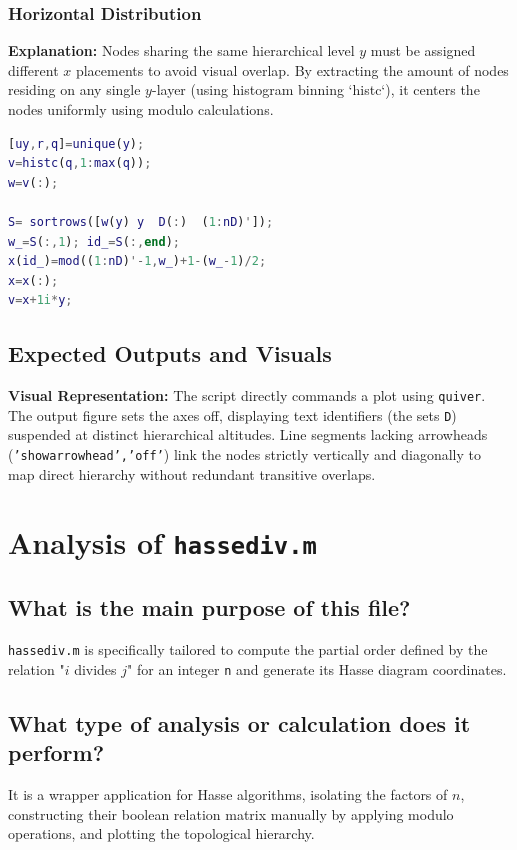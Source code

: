 \subsection{Horizontal Distribution}
\textbf{Explanation:} 
Nodes sharing the same hierarchical level $y$ must be assigned different $x$ placements to avoid visual overlap. By extracting the amount of nodes residing on any single $y$-layer (using histogram binning `histc`), it centers the nodes uniformly using modulo calculations.

\begin{lstlisting}[language=Matlab]
[uy,r,q]=unique(y);
v=histc(q,1:max(q));
w=v(:); 

S= sortrows([w(y) y  D(:)  (1:nD)']);
w_=S(:,1); id_=S(:,end);
x(id_)=mod((1:nD)'-1,w_)+1-(w_-1)/2;
x=x(:);
v=x+1i*y;
\end{lstlisting}

\section{Expected Outputs and Visuals}
\textbf{Visual Representation:} The script directly commands a plot using \texttt{quiver}. The output figure sets the axes off, displaying text identifiers (the sets \texttt{D}) suspended at distinct hierarchical altitudes. Line segments lacking arrowheads (\texttt{'showarrowhead','off'}) link the nodes strictly vertically and diagonally to map direct hierarchy without redundant transitive overlaps.


\newpage
\chapter{Analysis of \texttt{hassediv.m}}

\section{What is the main purpose of this file?}
\texttt{hassediv.m} is specifically tailored to compute the partial order defined by the relation "$i$ divides $j$" for an integer \texttt{n} and generate its Hasse diagram coordinates.

\section{What type of analysis or calculation does it perform?}
It is a wrapper application for Hasse algorithms, isolating the factors of $n$, constructing their boolean relation matrix manually by applying modulo operations, and plotting the topological hierarchy.

